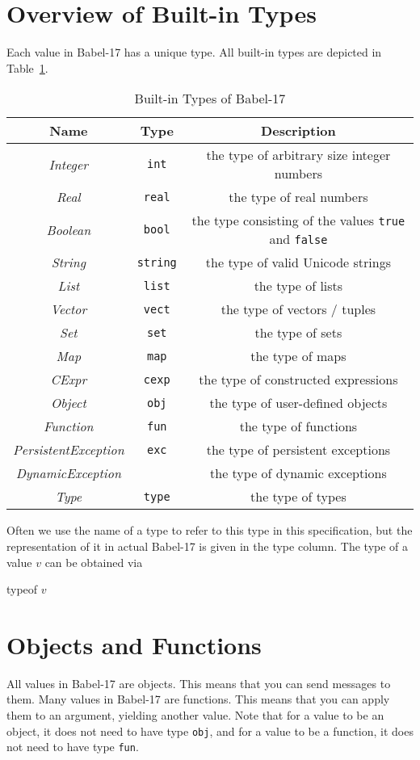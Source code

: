 \documentclass[11pt]{amsart}
\newcommand{\metababel}[1] {\textsl{#1}}
\newcommand{\babelsrc}[1] {\lstinline!#1!}
\begin{document}
\section{Overview of Built-in Types}
Each value in Babel-17 has a unique type. All built-in types are depicted in Table~\ref{table:builtintypes}.
\begin{table}
\caption{Built-in Types of Babel-17}
\begin{tabular}{c|c|c}
\textbf{Name} & \textbf{Type} & \textbf{Description}\\\hline
\metababel {Integer} & \verb+int+ & the type of arbitrary size integer numbers\\
\metababel {Real} & \verb+real+ & the type of real numbers\\
\metababel{Boolean} & \verb+bool+ &  the type consisting of the values \babelsrc{true} and \babelsrc{false}\\
\metababel{String} & \verb+string+ &  the type of valid Unicode strings\\
\metababel{List} & \verb+list+&  the type of lists\\
\metababel{Vector} & \verb+vect+ &  the type of vectors / tuples\\
\metababel{Set} & \verb+set+ &  the type of sets \\
\metababel{Map}& \verb+map+ &  the type of maps \\
\metababel{CExpr} & \verb+cexp+ &  the type of constructed expressions\\
\metababel{Object} & \verb+obj+ &  the type of user-defined objects\\
\metababel{Function} & \verb+fun+ &  the type of  functions\\
\metababel{PersistentException} & \verb+exc+ &  the type of persistent exceptions\\
\metababel{DynamicException} & &  the type of dynamic exceptions\\
\metababel{Type} &  \verb+type+ &  the type of types\\
\end{tabular}
\label{table:builtintypes}
\end{table}
Often we use the name of a type to refer to this type in this specification, but the representation of it in actual Babel-17 is given in the type column. 
The type of a value $v$ can be obtained via 
\begin{babellisting}
typeof $v$
\end{babellisting}

\section{Objects and Functions}
All values in Babel-17 are objects. This means that you can send messages to them. Many values in Babel-17 are functions. This means that you can apply them to an argument, yielding another value. Note that for a value to be an object, it does not need to have type \texttt{obj}, and for a value to be a function,  it does not need to have type \texttt{fun}. 
\end{document}
